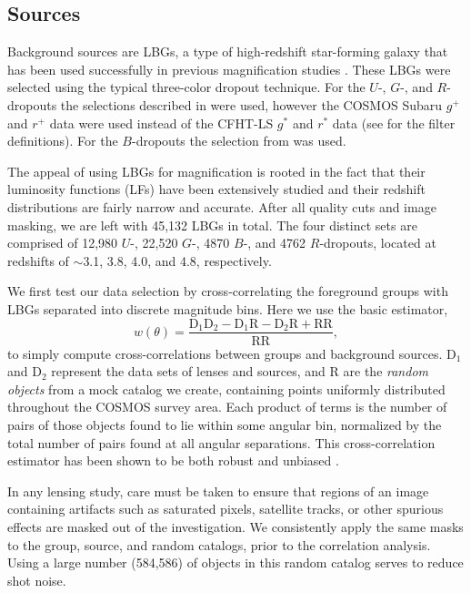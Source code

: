\documentclass[iop]{emulateapj}
\begin{document}
\subsection{Sources}
Background sources are LBGs, a type of high-redshift star-forming galaxy that has been used successfully in previous magnification studies \citep[see][]{Hildebrandt09b, Hildebrandt11}. These LBGs were selected using the typical three-color dropout technique. For the $U$-, $G$-, and $R$-dropouts the selections described in \citet{Hildebrandt09a} were used, however the COSMOS Subaru $g^+$ and $r^+$ data were used instead of the CFHT-LS $g^*$ and $r^*$ data (see \citet{Capak07} for the filter definitions). For the $B$-dropouts the selection from \citet{Ouchi04} was used.  

The appeal of using LBGs for magnification is rooted in the fact that their luminosity functions (LFs) have been extensively studied and their redshift distributions are fairly narrow and accurate. After all quality cuts and image masking, we are left with 45,132 LBGs in total. The four distinct sets are comprised of 12,980 $U$-, 22,520 $G$-, 4870 $B$-, and 4762 $R$-dropouts, located at redshifts of $\sim$3.1, 3.8, 4.0, and 4.8, respectively.

We first test our data selection by cross-correlating the foreground groups with LBGs separated into discrete magnitude bins. Here we use the basic \citet{LandySzalay93} estimator, 
\begin{equation}
w(\theta)=\frac{\text{D}_1 \text{D}_2 - \text{D}_1 \text{R} - \text{D}_2 \text{R} + \text{RR}}{\text{RR}},
\end{equation}
to simply compute cross-correlations between groups and background sources. D$_1$ and D$_2$ represent the data sets of lenses and sources, and R are the {\it random objects} from a mock catalog we create, containing points uniformly distributed throughout the COSMOS survey area. Each product of terms is the number of pairs of those objects found to lie within some angular bin, normalized by the total number of pairs found at all angular separations. This cross-correlation estimator has been shown to be both robust and unbiased \citep{Kerscher00}.  

In any lensing study, care must be taken to ensure that regions of an image containing artifacts such as saturated pixels, satellite tracks, or other spurious effects are masked out of the investigation. We consistently apply the same masks to the group, source, and random catalogs, prior to the correlation analysis. Using a large number (584,586) of objects in this random catalog serves to reduce shot noise.
\end{document}
